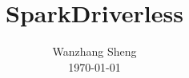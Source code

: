 \documentclass[twocolumn]{article}
\title{SparkDriverless}
\author{Wanzhang Sheng \\
\today \\
}
\begin{document}
\maketitle










\small


\end{document}
